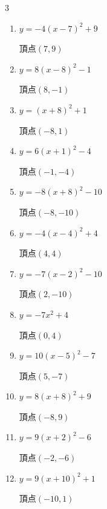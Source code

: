 \begin{multicols}{3}
\begin{enumerate}
  \item $\displaystyle y=-4\left( x-7\right)^{2}+9$

        $\displaystyle 頂点\left( 7 , 9 \right)$

  \item $\displaystyle y=8\left( x-8\right)^{2}-1$

        $\displaystyle 頂点\left( 8 , -1 \right)$

  \item $\displaystyle y=\left( x+8\right)^{2}+1$

        $\displaystyle 頂点\left( -8 , 1 \right)$

  \item $\displaystyle y=6\left( x+1\right)^{2}-4$

        $\displaystyle 頂点\left( -1 , -4 \right)$

  \item $\displaystyle y=-8\left( x+8\right)^{2}-10$

        $\displaystyle 頂点\left( -8 , -10 \right)$

  \item $\displaystyle y=-4\left( x-4\right)^{2}+4$

        $\displaystyle 頂点\left( 4 , 4 \right)$

  \item $\displaystyle y=-7\left( x-2\right)^{2}-10$

        $\displaystyle 頂点\left( 2 , -10 \right)$

  \item $\displaystyle y=-7x^{2}+4$

        $\displaystyle 頂点\left( 0 , 4 \right)$

  \item $\displaystyle y=10\left( x-5\right)^{2}-7$

        $\displaystyle 頂点\left( 5 , -7 \right)$

  \item $\displaystyle y=8\left( x+8\right)^{2}+9$

        $\displaystyle 頂点\left( -8 , 9 \right)$

  \item $\displaystyle y=9\left( x+2\right)^{2}-6$

        $\displaystyle 頂点\left( -2 , -6 \right)$

  \item $\displaystyle y=9\left( x+10\right)^{2}+1$

        $\displaystyle 頂点\left( -10 , 1 \right)$


\end{enumerate}
\end{multicols}
